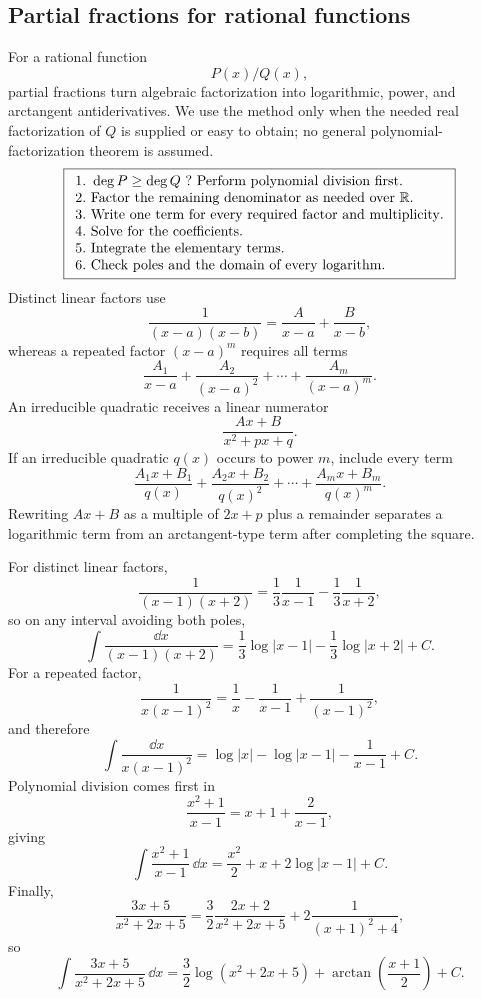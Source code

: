 \subsection{Partial fractions for rational functions}
For a rational function
\[
P(x)/Q(x),
\]
 partial fractions turn algebraic
factorization into logarithmic, power, and arctangent antiderivatives. We use
the method only when the needed real factorization of \(Q\) is supplied or
easy to obtain; no general polynomial-factorization theorem is assumed.
\[
\boxed{
\begin{array}{l}
1.\ \deg P\geq\deg Q\ ?\ \text{Perform polynomial division first}.\\
2.\ \text{Factor the remaining denominator as needed over }\mathbb{R}.\\
3.\ \text{Write one term for every required factor and multiplicity}.\\
4.\ \text{Solve for the coefficients}.\\
5.\ \text{Integrate the elementary terms}.\\
6.\ \text{Check poles and the domain of every logarithm}.
\end{array}}
\]
Distinct linear factors use
\[
\frac1{(x-a)(x-b)}=\frac{A}{x-a}+\frac{B}{x-b},
\]
whereas a repeated factor \((x-a)^m\) requires all terms
\[
\frac{A_1}{x-a}+\frac{A_2}{(x-a)^2}+\cdots+
\frac{A_m}{(x-a)^m}.
\]
An irreducible quadratic receives a linear numerator
\[
\frac{Ax+B}{x^2+px+q}.
\]
If an irreducible quadratic $q(x)$ occurs to power $m$, include every term
\[
\frac{A_1x+B_1}{q(x)}+\frac{A_2x+B_2}{q(x)^2}
+\cdots+\frac{A_mx+B_m}{q(x)^m}.
\]
Rewriting \(Ax+B\) as a multiple of \(2x+p\) plus a remainder separates a
logarithmic term from an arctangent-type term after completing the square.

\begin{example}
For distinct linear factors,
\[
\frac1{(x-1)(x+2)}
=\frac13\frac1{x-1}-\frac13\frac1{x+2},
\]
so on any interval avoiding both poles,
\[
\int\frac{\dd x}{(x-1)(x+2)}
=\frac13\log|x-1|-\frac13\log|x+2|+C.
\]
For a repeated factor,
\[
\frac1{x(x-1)^2}=\frac1x-\frac1{x-1}+\frac1{(x-1)^2},
\]
and therefore
\[
\int\frac{\dd x}{x(x-1)^2}
=\log|x|-\log|x-1|-\frac1{x-1}+C.
\]
Polynomial division comes first in
\[
\frac{x^2+1}{x-1}=x+1+\frac2{x-1},
\]
giving
\[
\int\frac{x^2+1}{x-1}\,\dd x
=\frac{x^2}{2}+x+2\log|x-1|+C.
\]
Finally,
\[
\frac{3x+5}{x^2+2x+5}
=\frac32\frac{2x+2}{x^2+2x+5}
+2\frac1{(x+1)^2+4},
\]
so
\[
\int\frac{3x+5}{x^2+2x+5}\,\dd x
=\frac32\log(x^2+2x+5)+\arctan\left(\frac{x+1}{2}\right)+C.
\]
\end{example}

